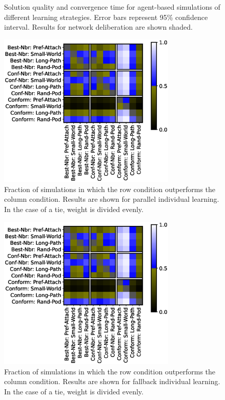 \begin{figure}[]
\begin{minipage}{1.875in}
    \end{minipage}
	\caption{
	Solution quality and convergence time for agent-based simulations of different learning strategies. Error bars represent 95\% confidence interval. Results for network deliberation are shown shaded.
	}
    \label{fig:ch03results}
\end{figure}

\begin{figure}
    \centering
    \includegraphics[width=3.33in]{chapters/figures/NetDelibABM/fig-result-frac-parallel.eps}
	\caption{Fraction of simulations in which the row condition outperforms the column condition. Results are shown for parallel individual learning. In the case of a tie, weight is divided evenly.}
    \label{fig:results-frac-parallel}
\end{figure}

\begin{figure}
    \centering
    \includegraphics[width=3.33in]{chapters/figures/NetDelibABM/fig-result-frac-parallel.eps}
	\caption{Fraction of simulations in which the row condition outperforms the column condition. Results are shown for fallback individual learning. In the case of a tie, weight is divided evenly.}
    \label{fig:results-frac-fallback}
\end{figure}

